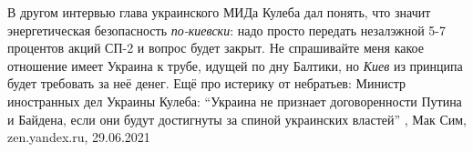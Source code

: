 В другом интервью глава украинского МИДа Кулеба дал понять, что значит
энергетическая безопасность \emph{по-киевски}: надо просто передать незалэжной 5-7
процентов акций СП-2 и вопрос будет закрыт. Не спрашивайте меня какое отношение
имеет Украина к трубе, идущей по дну Балтики, но \emph{Киев} из принципа будет
требовать за неё денег.  Ещё про истерику от небратьев: Министр иностранных дел
Украины Кулеба: \enquote{Украина не признает договоренности Путина и Байдена, если они
будут достигнуты за спиной украинских властей}
, 
Мак Сим, zen.yandex.ru, 29.06.2021

